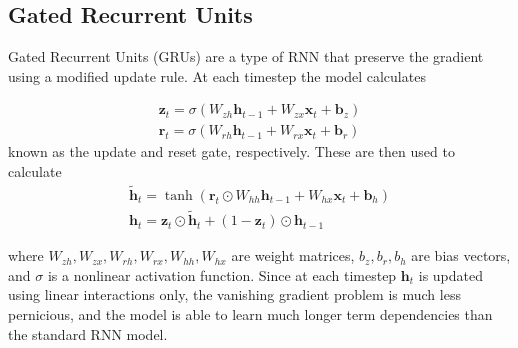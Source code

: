 \subsection*{Gated Recurrent Units}

Gated Recurrent Units (GRUs) \cite{cho2014gru} are a type of RNN that preserve the gradient using a modified update rule. At each timestep the model calculates

\begin{gather*}
	\mathbf{z}_t = \sigma(W_{zh} \mathbf{h}_{t-1} + W_{zx} \mathbf{x}_t + \mathbf{b}_z)\\
	\mathbf{r}_t = \sigma(W_{rh} \mathbf{h}_{t-1} + W_{rx} \mathbf{x}_t + \mathbf{b}_r)
\end{gather*}
known as the update and reset gate, respectively. These are then used to calculate
\begin{gather*}
	\mathbf{\tilde{h}}_t = \tanh(\mathbf{r}_t \odot W_{hh} \mathbf{h}_{t-1} + W_{hx} \mathbf{x}_t + \mathbf{b}_h)\\
	\mathbf{h}_t = \mathbf{z}_t \odot \mathbf{\tilde{h}}_t + (1 - \mathbf{z}_t) \odot \mathbf{h}_{t-1}
\end{gather*}

where \(W_{zh}, W_{zx}, W_{rh}, W_{rx}, W_{hh}, W_{hx}\) are weight matrices, \(b_z, b_r, b_h\) are bias vectors, and \(\sigma\) is a nonlinear activation function. Since at each timestep \(\mathbf{h}_t\) is updated using linear interactions only, the vanishing gradient problem is much less pernicious, and the model is able to learn much longer term dependencies than the standard RNN model. 